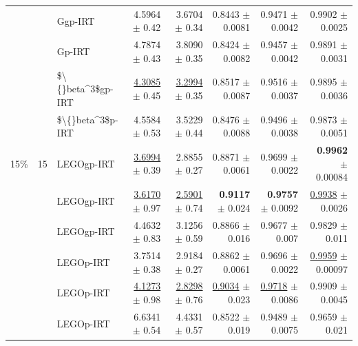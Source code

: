 \begin{longtable}{llp{}rrrrr}
 &  & Ggp-IRT & 4.5964 {\scriptsize $\pm$ 0.42} & 3.6704 {\scriptsize $\pm$ 0.34} & 0.8443 {\scriptsize $\pm$ 0.0081} & 0.9471 {\scriptsize $\pm$ 0.0042} & 0.9902 {\scriptsize $\pm$ 0.0025} \\
 &  & Gp-IRT & 4.7874 {\scriptsize $\pm$ 0.43} & 3.8090 {\scriptsize $\pm$ 0.35} & 0.8424 {\scriptsize $\pm$ 0.0082} & 0.9457 {\scriptsize $\pm$ 0.0042} & 0.9891 {\scriptsize $\pm$ 0.0031} \\
 &  & \$\textbackslash\{\}beta\textasciicircum{}3\$gp-IRT & \underline{4.3085} {\scriptsize $\pm$ 0.45} & \underline{3.2994} {\scriptsize $\pm$ 0.35} & 0.8517 {\scriptsize $\pm$ 0.0087} & 0.9516 {\scriptsize $\pm$ 0.0037} & 0.9895 {\scriptsize $\pm$ 0.0036} \\
 &  & \$\textbackslash\{\}beta\textasciicircum{}3\$p-IRT & 4.5584 {\scriptsize $\pm$ 0.53} & 3.5229 {\scriptsize $\pm$ 0.44} & 0.8476 {\scriptsize $\pm$ 0.0088} & 0.9496 {\scriptsize $\pm$ 0.0038} & 0.9873 {\scriptsize $\pm$ 0.0051} \\
\midrule
15\% & 15 & LEGOgp-IRT & \underline{3.6994} {\scriptsize $\pm$ 0.39} & 2.8855 {\scriptsize $\pm$ 0.27} & 0.8871 {\scriptsize $\pm$ 0.0061} & 0.9699 {\scriptsize $\pm$ 0.0022} & \textbf{0.9962} {\scriptsize $\pm$ 0.00084} \\
 &  & LEGOgp-IRT & \underline{3.6170} {\scriptsize $\pm$ 0.97} & \underline{2.5901} {\scriptsize $\pm$ 0.74} & \textbf{0.9117} {\scriptsize $\pm$ 0.024} & \textbf{0.9757} {\scriptsize $\pm$ 0.0092} & \underline{0.9938} {\scriptsize $\pm$ 0.0026} \\
 &  & LEGOgp-IRT & 4.4632 {\scriptsize $\pm$ 0.83} & 3.1256 {\scriptsize $\pm$ 0.59} & 0.8866 {\scriptsize $\pm$ 0.016} & 0.9677 {\scriptsize $\pm$ 0.007} & 0.9829 {\scriptsize $\pm$ 0.011} \\
 &  & LEGOp-IRT & 3.7514 {\scriptsize $\pm$ 0.38} & 2.9184 {\scriptsize $\pm$ 0.27} & 0.8862 {\scriptsize $\pm$ 0.0061} & 0.9696 {\scriptsize $\pm$ 0.0022} & \underline{0.9959} {\scriptsize $\pm$ 0.00097} \\
 &  & LEGOp-IRT & \underline{4.1273} {\scriptsize $\pm$ 0.98} & \underline{2.8298} {\scriptsize $\pm$ 0.76} & \underline{0.9034} {\scriptsize $\pm$ 0.023} & \underline{0.9718} {\scriptsize $\pm$ 0.0086} & 0.9909 {\scriptsize $\pm$ 0.0045} \\
 &  & LEGOp-IRT & 6.6341 {\scriptsize $\pm$ 0.54} & 4.4331 {\scriptsize $\pm$ 0.57} & 0.8522 {\scriptsize $\pm$ 0.019} & 0.9489 {\scriptsize $\pm$ 0.0075} & 0.9659 {\scriptsize $\pm$ 0.021} \\

\end{longtable}
